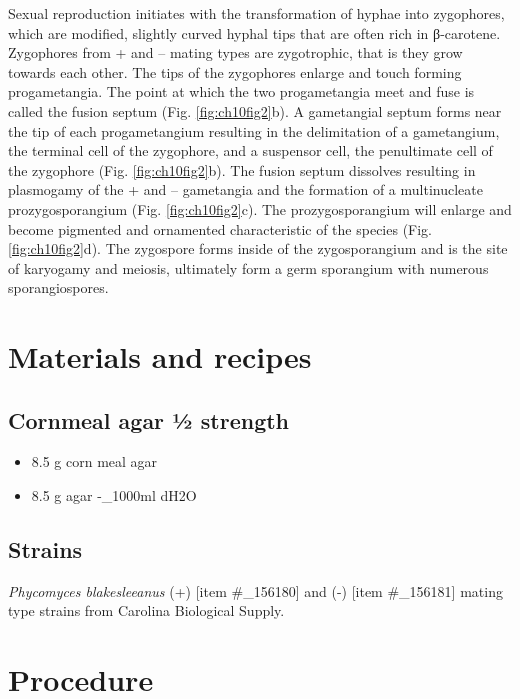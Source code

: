 \documentclass[]{book}
\providecommand{\tightlist}{%
  \setlength{\itemsep}{0pt}\setlength{\parskip}{0pt}}
\begin{document}
Sexual reproduction initiates with the transformation of hyphae into zygophores, which are modified, slightly curved hyphal tips that are often rich in β-carotene. Zygophores from + and -- mating types are zygotrophic, that is they grow towards each other. The tips of the zygophores enlarge and touch forming progametangia. The point at which the two progametangia meet and fuse is called the fusion septum (Fig. \ref{fig:ch10fig2}b). A gametangial septum forms near the tip of each progametangium resulting in the delimitation of a gametangium, the terminal cell of the zygophore, and a suspensor cell, the penultimate cell of the zygophore (Fig. \ref{fig:ch10fig2}b). The fusion septum dissolves resulting in plasmogamy of the + and -- gametangia and the formation of a multinucleate prozygosporangium (Fig. \ref{fig:ch10fig2}c). The prozygosporangium will enlarge and become pigmented and ornamented characteristic of the species (Fig. \ref{fig:ch10fig2}d). The zygospore forms inside of the zygosporangium and is the site of karyogamy and meiosis, ultimately form a germ sporangium with numerous sporangiospores.

\hypertarget{materials-and-recipes-1}{%
\section{Materials and recipes}\label{materials-and-recipes-1}}

\hypertarget{cornmeal-agar--strength}{%
\subsection{\texorpdfstring{{Cornmeal agar ½ strength}}{Cornmeal agar ½ strength}}\label{cornmeal-agar--strength}}

\begin{itemize}
\tightlist
\item
  8.5 g corn meal agar
\item
  8.5 g agar
  -\_1000ml dH2O
\end{itemize}

\hypertarget{strains}{%
\subsection{Strains}\label{strains}}

\emph{Phycomyces blakesleeanus }(+) {[}item \#\_156180{]} and (-) {[}item \#\_156181{]} mating type strains from Carolina Biological Supply.

\hypertarget{procedure-3}{%
\section{Procedure}\label{procedure-3}}
\end{document}
